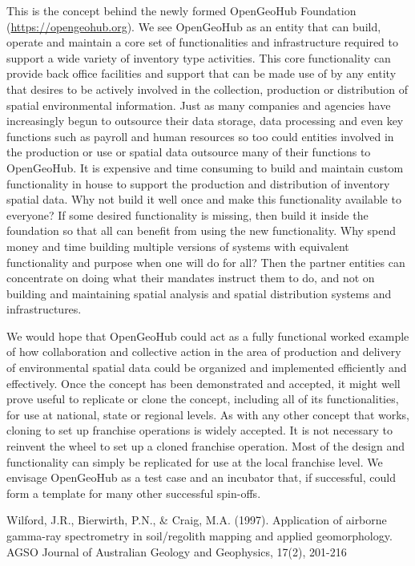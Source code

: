 \documentclass[graybox,natbib,nospthms,UStrade]{svmono}
\begin{document}
This is the concept behind the newly formed OpenGeoHub Foundation
(\url{https://opengeohub.org}). We see OpenGeoHub as an entity that can build,
operate and maintain a core set of functionalities and infrastructure
required to support a wide variety of inventory type activities.
This core functionality can provide back office facilities
and support that can be made use of by any entity that
desires to be actively involved in the collection, production or
distribution of spatial environmental information. Just as many
companies and agencies have increasingly begun to outsource their data
storage, data processing and even key functions such as payroll and
human resources so too could entities involved in the production or use
or spatial data outsource many of their functions to OpenGeoHub. It is
expensive and time consuming to build and maintain custom functionality
in house to support the production and distribution of inventory spatial
data. Why not build it well once and make this functionality available
to everyone? If some desired functionality is missing, then build it
inside the foundation so that all can benefit from using the new
functionality. Why spend money and time building multiple versions of
systems with equivalent functionality and purpose when one will do for
all? Then the partner entities can concentrate on doing what their
mandates instruct them to do, and not on building and maintaining
spatial analysis and spatial distribution systems and infrastructures.

We would hope that OpenGeoHub could act as a fully functional worked
example of how collaboration and collective action in the area of
production and delivery of environmental spatial data could be organized
and implemented efficiently and effectively. Once the concept has been
demonstrated and accepted, it might well prove useful to replicate or
clone the concept, including all of its functionalities, for use at
national, state or regional levels. As with any other concept that
works, cloning to set up franchise operations is widely accepted. It is
not necessary to reinvent the wheel to set up a cloned franchise
operation. Most of the design and functionality can simply be replicated
for use at the local franchise level. We envisage OpenGeoHub as a test
case and an incubator that, if successful, could form a template for
many other successful spin-offs.

Wilford, J.R., Bierwirth, P.N., \& Craig, M.A. (1997). Application of airborne gamma-ray spectrometry in soil/regolith mapping and applied geomorphology. AGSO Journal of Australian Geology and Geophysics, 17(2), 201-216



\backmatter
\printindex
\end{document}
